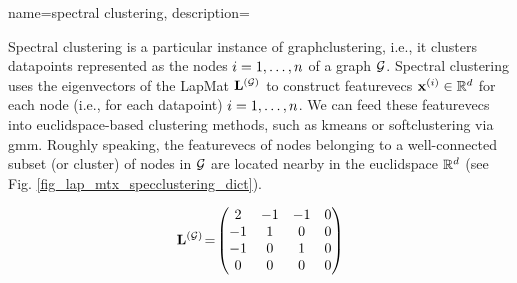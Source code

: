 {name={spectral clustering},
	description={Spectral \gls{clustering} is a particular instance of 
		\gls{graphclustering}, i.e., it clusters \glspl{datapoint} 
		represented as the nodes $i=1,\ldots,n$ of a \gls{graph} $\mathcal{G}$. 
		Spectral \gls{clustering} uses the \glspl{eigenvector} of the \gls{LapMat} ${\bf L}^{(\mathcal{G})}$ 
		to construct \glspl{featurevec} ${\bf x}^{(i)} \in \mathbb{R}^{d}$ 
		for each node (i.e., for each \gls{datapoint}) $i=1,\ldots,n$. We can feed these \glspl{featurevec} 
		into \gls{euclidspace}-based \gls{clustering} methods, such as \gls{kmeans} 
		or \gls{softclustering} via \gls{gmm}. Roughly speaking, the \glspl{featurevec} of nodes 
		belonging to a well-connected subset (or \gls{cluster}) of nodes in $\mathcal{G}$ are located 
		nearby in the \gls{euclidspace} $\mathbb{R}^{d}$ (see Fig. \ref{fig_lap_mtx_specclustering_dict}). 
		\begin{figure}[H]
			\begin{center}
				\begin{minipage}{0.4\textwidth}
				\end{minipage} 
				\hspace*{5mm}
				\begin{minipage}{0.4\textwidth}
					\begin{equation} 
						{\bf L}^{(\mathcal{G})}\!=\!
						\begin{pmatrix} 
							2 & -1 & -1 & 0 \\ 
							-1 & 1 & 0 & 0 \\  
							-1 & 0 & 1 & 0 \\ 
							0 & 0 & 0 & 0 

\end{pmatrix}
\end{equation}
\end{minipage}
\end{center}
\end{figure}}}
